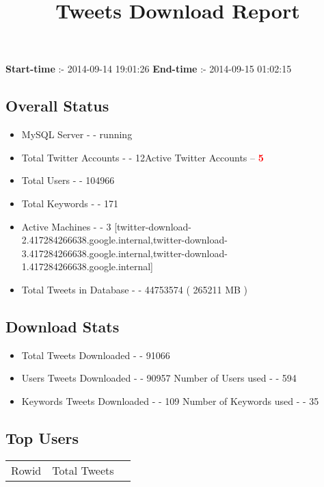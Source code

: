 \documentclass{article}\usepackage[T1]{fontenc}
\begin{document}
\title{\textbf{Tweets Download Report}}
               \date{}
                \maketitle
               \centerline{\textbf{Start-time} :- 2014-09-14 19:01:26 \hspace{40pt} \textbf{End-time} :- 2014-09-15 01:02:15}               \subsection*{Overall Status}                \begin{itemize}                \item MySQL Server - - running               \item Total Twitter Accounts - - 12\newline Active Twitter Accounts -- \textcolor{red}{\textbf{5}}               \item Total Users - - 104966               \item Total Keywords - - 171               \item Active Machines - - 3 [twitter-download-2.417284266638.google.internal,twitter-download-3.417284266638.google.internal,twitter-download-1.417284266638.google.internal]               \item Total Tweets in Database - - 44753574 ( 265211 MB )               \end{itemize}               \subsection*{Download Stats}                \begin{itemize}                \item Total Tweets Downloaded - - 91066               \item Users Tweets Downloaded - - 90957 \newline Number of Users used - - 594               \item Keywords Tweets Downloaded - - 109 \newline Number of Keywords used - - 35              \end{itemize}              \subsection*{Top Users}\begin{tabular}{|c|c|c|}         \hline         Rowid & Total Tweets \\ 

\end{tabular}
\end{document}
